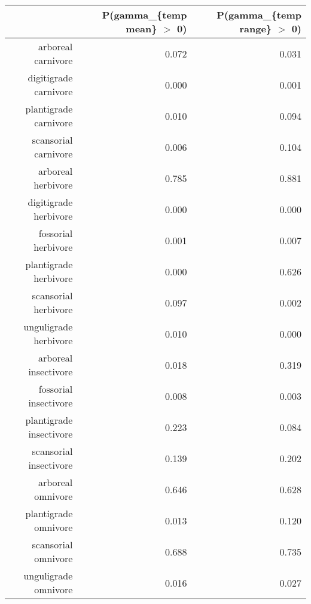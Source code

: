 \begin{table}[ht]
\centering
\begin{tabular}{rrr}
  \hline
 & P(gamma\_\{temp mean\} $>$ 0) & P(gamma\_\{temp range\} $>$ 0) \\ 
  \hline
arboreal carnivore & 0.072 & 0.031 \\ 
  digitigrade carnivore & 0.000 & 0.001 \\ 
  plantigrade carnivore & 0.010 & 0.094 \\ 
  scansorial carnivore & 0.006 & 0.104 \\ 
  arboreal herbivore & 0.785 & 0.881 \\ 
  digitigrade herbivore & 0.000 & 0.000 \\ 
  fossorial herbivore & 0.001 & 0.007 \\ 
  plantigrade herbivore & 0.000 & 0.626 \\ 
  scansorial herbivore & 0.097 & 0.002 \\ 
  unguligrade herbivore & 0.010 & 0.000 \\ 
  arboreal insectivore & 0.018 & 0.319 \\ 
  fossorial insectivore & 0.008 & 0.003 \\ 
  plantigrade insectivore & 0.223 & 0.084 \\ 
  scansorial insectivore & 0.139 & 0.202 \\ 
  arboreal omnivore & 0.646 & 0.628 \\ 
  plantigrade omnivore & 0.013 & 0.120 \\ 
  scansorial omnivore & 0.688 & 0.735 \\ 
  unguligrade omnivore & 0.016 & 0.027 \\ 
   \hline
\end{tabular}
\label{tab:origin_temp}
\end{table}

